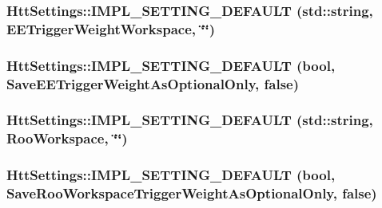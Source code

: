 \hypertarget{classHttSettings_a53af2d1183b8dc100d05a54b1a5568ec}{
\subsubsection[{IMPL\_\-SETTING\_\-DEFAULT}]{\setlength{\rightskip}{0pt plus 5cm}HttSettings::IMPL\_\-SETTING\_\-DEFAULT (std::string, \/  EETriggerWeightWorkspace, \/  \char`\"{}\char`\"{})}}
\label{classHttSettings_a53af2d1183b8dc100d05a54b1a5568ec}
\hypertarget{classHttSettings_ac00e304a4e11243e33168edf333e61d5}{
\subsubsection[{IMPL\_\-SETTING\_\-DEFAULT}]{\setlength{\rightskip}{0pt plus 5cm}HttSettings::IMPL\_\-SETTING\_\-DEFAULT (bool, \/  SaveEETriggerWeightAsOptionalOnly, \/  false)}}
\label{classHttSettings_ac00e304a4e11243e33168edf333e61d5}
\hypertarget{classHttSettings_a7163f114debc502fabc0a31866245f88}{
\subsubsection[{IMPL\_\-SETTING\_\-DEFAULT}]{\setlength{\rightskip}{0pt plus 5cm}HttSettings::IMPL\_\-SETTING\_\-DEFAULT (std::string, \/  RooWorkspace, \/  \char`\"{}\char`\"{})}}
\label{classHttSettings_a7163f114debc502fabc0a31866245f88}
\hypertarget{classHttSettings_a0e185c7c739d7efa8caf9a8449604110}{
\subsubsection[{IMPL\_\-SETTING\_\-DEFAULT}]{\setlength{\rightskip}{0pt plus 5cm}HttSettings::IMPL\_\-SETTING\_\-DEFAULT (bool, \/  SaveRooWorkspaceTriggerWeightAsOptionalOnly, \/  false)}}
\label{classHttSettings_a0e185c7c739d7efa8caf9a8449604110}
